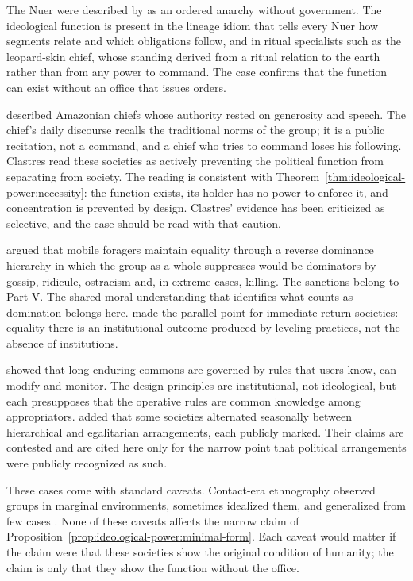 \documentclass[11pt,letterpaper]{article}
\theoremstyle{definition}
\theoremstyle{remark}
\begin{document}
The Nuer were described by \citet{evanspritchard1940} as an ordered anarchy without government. The ideological function is present in the lineage idiom that tells every Nuer how segments relate and which obligations follow, and in ritual specialists such as the leopard-skin chief, whose standing derived from a ritual relation to the earth rather than from any power to command. The case confirms that the function can exist without an office that issues orders.

\citet{clastres1987} described Amazonian chiefs whose authority rested on generosity and speech. The chief's daily discourse recalls the traditional norms of the group; it is a public recitation, not a command, and a chief who tries to command loses his following. Clastres read these societies as actively preventing the political function from separating from society. The reading is consistent with Theorem~\ref{thm:ideological-power:necessity}: the function exists, its holder has no power to enforce it, and concentration is prevented by design. Clastres' evidence has been criticized as selective, and the case should be read with that caution.

\citet{boehm1999} argued that mobile foragers maintain equality through a reverse dominance hierarchy in which the group as a whole suppresses would-be dominators by gossip, ridicule, ostracism and, in extreme cases, killing. The sanctions belong to Part V. The shared moral understanding that identifies what counts as domination belongs here. \citet{woodburn1982} made the parallel point for immediate-return societies: equality there is an institutional outcome produced by leveling practices, not the absence of institutions.

\citet{ostrom1990} showed that long-enduring commons are governed by rules that users know, can modify and monitor. The design principles are institutional, not ideological, but each presupposes that the operative rules are common knowledge among appropriators. \citet{graeber2021} added that some societies alternated seasonally between hierarchical and egalitarian arrangements, each publicly marked. Their claims are contested and are cited here only for the narrow point that political arrangements were publicly recognized as such.

These cases come with standard caveats. Contact-era ethnography observed groups in marginal environments, sometimes idealized them, and generalized from few cases \citep{kelly1995}. None of these caveats affects the narrow claim of Proposition~\ref{prop:ideological-power:minimal-form}. Each caveat would matter if the claim were that these societies show the original condition of humanity; the claim is only that they show the function without the office.
\end{document}

